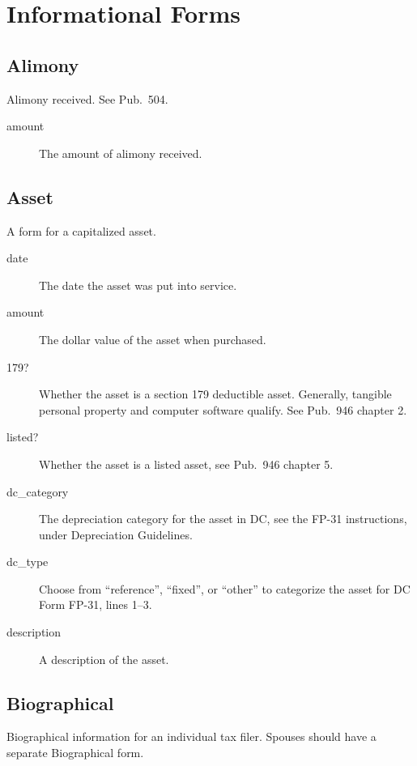 \section{Informational Forms}



\subsection{Alimony}

Alimony received. See Pub.\ 504.

\begin{description}
\item[amount] The amount of alimony received.
\end{description}


\subsection{Asset}

A form for a capitalized asset.

\begin{description}
\item[date] The date the asset was put into service.
\item[amount] The dollar value of the asset when purchased.
\item[179?] Whether the asset is a section 179 deductible asset. Generally,
tangible personal property and computer software qualify. See Pub.~946 chapter
2.
\item[listed?] Whether the asset is a listed asset, see Pub.~946 chapter 5.
\item[dc\_category] The depreciation category for the asset in DC, see the FP-31
instructions, under Depreciation Guidelines.
\item[dc\_type] Choose from ``reference'', ``fixed'', or ``other'' to categorize
the asset for DC Form FP-31, lines 1--3.
\item[description] A description of the asset.
\end{description}


\subsection{Biographical}

Biographical information for an individual tax filer. Spouses should have a
separate Biographical form.

